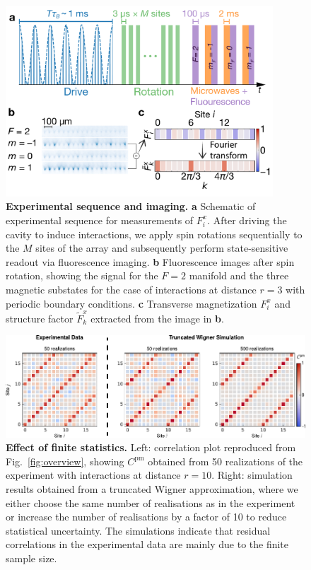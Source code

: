 \documentclass[aps,pra,twocolumn,superscriptaddress]{revtex4-1} %
\begin{document}
\begin{figure}[htb]
    \includegraphics[width = 100mm]{Figures/ExtData1.pdf}
    \caption{\textbf{Experimental sequence and imaging.} \textbf{a} Schematic of experimental sequence for measurements of $F^x_i$.  After driving the cavity to induce interactions, we apply spin rotations sequentially to the $M$ sites of the array and subsequently perform state-sensitive readout via fluorescence imaging.
    \textbf{b} Fluorescence images after spin rotation, showing the signal for the $F=2$ manifold and the three magnetic substates for the case of interactions at distance $r = 3$ with periodic boundary conditions. \textbf{c} Transverse magnetization $F^x_i$ and structure factor $\tilde{F}^x_k$ extracted from the image in \textbf{b}.}
    \label{fig:sequence}
\end{figure}
\newpage
\begin{figure}[h]
    \centering
    \includegraphics{Figures/ExtData2.pdf}
    \caption{\textbf{Effect of finite statistics.} Left: correlation plot reproduced from Fig.~\ref{fig:overview}, showing $C^\mathrm{pm}$ obtained from 50 realizations of the experiment with interactions at distance $r = 10$. Right: simulation results obtained from a truncated Wigner approximation, where we either choose the same number of realisations as in the experiment or increase the number of realisations by a factor of 10 to reduce statistical uncertainty. The simulations indicate that residual correlations in the experimental data are mainly due to the finite sample size.}
    \label{ExtFig:FiniteStat}
\end{figure}
\end{document}
